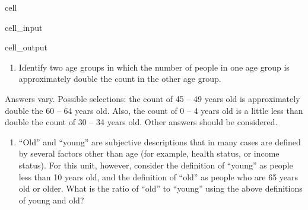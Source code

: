 \documentclass[letterpaper,10pt,english]{jupyterBook}
\begin{document}
\begin{sphinxuseclass}{cell}\begin{sphinxVerbatimInput}

\begin{sphinxuseclass}{cell_input}
\begin{sphinxVerbatim}[commandchars=\\\{\}]
\end{sphinxVerbatim}

\end{sphinxuseclass}\end{sphinxVerbatimInput}
\begin{sphinxVerbatimOutput}

\begin{sphinxuseclass}{cell_output}
\noindent{}

\end{sphinxuseclass}\end{sphinxVerbatimOutput}

\end{sphinxuseclass}\begin{enumerate}
%
\setcounter{enumi}{2}
\item {} 
\sphinxAtStartPar
Identify two age groups in which the number of people in one age group is
approximately double the count in the other age group.

\end{enumerate}

\sphinxAtStartPar
Answers vary. Possible selections: the count of 45 – 49 years old is approximately
double the 60 – 64 years old. Also, the count of 0 – 4 years old is a little less than
double the count of 30 – 34 years old. Other answers should be considered.
\begin{enumerate}
%
\setcounter{enumi}{3}
\item {} 
\sphinxAtStartPar
“Old” and “young” are subjective descriptions that in many cases are defined by
several factors other than age (for example, health status, or income status). For
this unit, however, consider the definition of “young” as people less than 10 years
old, and the definition of “old” as people who are 65 years old or older. What is the
ratio of “old” to “young” using the above definitions of young and old?

\end{enumerate}
\end{document}
